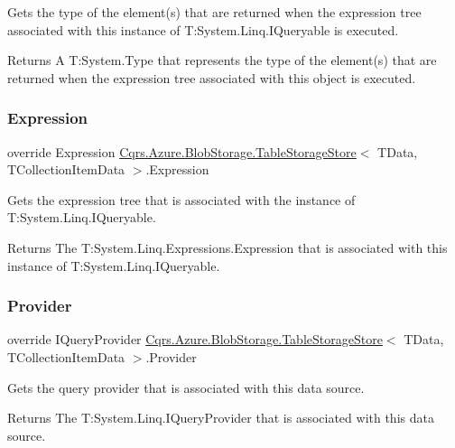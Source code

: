 Gets the type of the element(s) that are returned when the expression tree associated with this instance of T\+:\+System.\+Linq.\+I\+Queryable is executed. 

\begin{DoxyReturn}{Returns}
A T\+:\+System.\+Type that represents the type of the element(s) that are returned when the expression tree associated with this object is executed. 
\end{DoxyReturn}
\mbox{\label{classCqrs_1_1Azure_1_1BlobStorage_1_1TableStorageStore_af7d55541709a0519bdb0b5d201c5a97c}} 
\subsubsection{\texorpdfstring{Expression}{Expression}}
{\footnotesize\ttfamily override Expression \hyperlink{classCqrs_1_1Azure_1_1BlobStorage_1_1TableStorageStore}{Cqrs.\+Azure.\+Blob\+Storage.\+Table\+Storage\+Store}$<$ T\+Data, T\+Collection\+Item\+Data $>$.Expression\hspace{0.3cm}{\ttfamily [get]}}



Gets the expression tree that is associated with the instance of T\+:\+System.\+Linq.\+I\+Queryable. 

\begin{DoxyReturn}{Returns}
The T\+:\+System.\+Linq.\+Expressions.\+Expression that is associated with this instance of T\+:\+System.\+Linq.\+I\+Queryable. 
\end{DoxyReturn}
\mbox{\label{classCqrs_1_1Azure_1_1BlobStorage_1_1TableStorageStore_a95c1b0fce651992dd6bd75f44da15829}} 
\subsubsection{\texorpdfstring{Provider}{Provider}}
{\footnotesize\ttfamily override I\+Query\+Provider \hyperlink{classCqrs_1_1Azure_1_1BlobStorage_1_1TableStorageStore}{Cqrs.\+Azure.\+Blob\+Storage.\+Table\+Storage\+Store}$<$ T\+Data, T\+Collection\+Item\+Data $>$.Provider\hspace{0.3cm}{\ttfamily [get]}}



Gets the query provider that is associated with this data source. 

\begin{DoxyReturn}{Returns}
The T\+:\+System.\+Linq.\+I\+Query\+Provider that is associated with this data source. 
\end{DoxyReturn}
